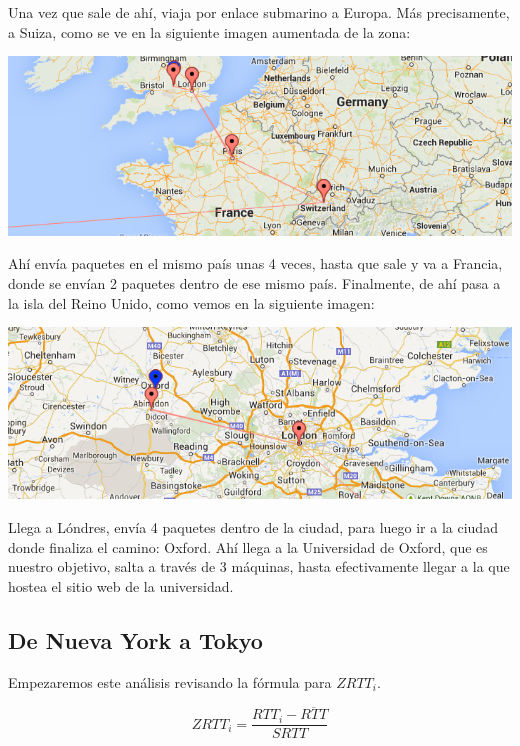 Una vez que sale de ahí, viaja por enlace submarino a Europa. Más precisamente, a Suiza, como se ve en la siguiente imagen aumentada de la zona:

\begin{center}
	\includegraphics[scale=0.6]{graphics/europe_zoom.png}
\end{center}

Ahí envía paquetes en el mismo país unas 4 veces, hasta que sale y va a Francia, donde se envían 2 paquetes dentro de ese mismo país. Finalmente, de ahí pasa a la isla del Reino Unido, como vemos en la siguiente imagen:

\begin{center}
	\includegraphics[scale=0.6]{graphics/united_kingdom_zoom.png}
\end{center}

Llega a Lóndres, envía 4 paquetes dentro de la ciudad, para luego ir a la ciudad donde finaliza el camino: Oxford. Ahí llega a la Universidad de Oxford, que es nuestro objetivo, salta a través de 3 máquinas, hasta efectivamente llegar a la que hostea el sitio web de la universidad.

\clearpage

\subsection{De Nueva York a Tokyo}

Empezaremos este análisis revisando la fórmula para \textit{$ZRTT_i$}.

$$ ZRTT_i = \frac{RTT_i - \overline{RTT}}{SRTT} $$

